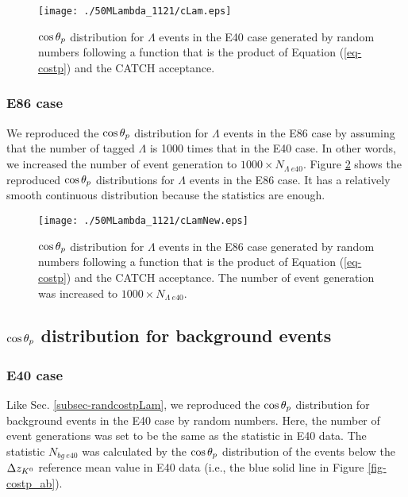 \begin{figure}[h]
  \centering
  \texttt{[image: ./50MLambda\_1121/cLam.eps]}
  \caption{$\cos{\theta_p}$ distribution for $\Lambda$ events in the E40 case generated by random numbers following a function that is the product of Equation (\ref{eq-costp}) and the CATCH acceptance. %
  }
  \label{fig-cLam}
\end{figure}

\subsubsection{E86 case}
We reproduced the $\cos{\theta_p}$ distribution for $\Lambda$ events in the E86 case by assuming that the number of tagged $\Lambda$ is 1000 times that in the E40 case. In other words, we increased the number of event generation to $1000\times N_{\Lambda\ e40}$. Figure \ref{fig-cLamNew} shows the reproduced $\cos{\theta_p}$ distributions for $\Lambda$ events in the E86 case. It has a relatively smooth continuous distribution because the statistics are enough.

\begin{figure}[h]
  \centering
  \texttt{[image: ./50MLambda\_1121/cLamNew.eps]}
  \caption{$\cos{\theta_p}$ distribution for $\Lambda$ events in the E86 case generated by random numbers following a function that is the product of Equation (\ref{eq-costp}) and the CATCH acceptance. The number of event generation was increased to $1000\times N_{\Lambda\ e40}$.}
  \label{fig-cLamNew}
\end{figure}


\subsection{$\cos{\theta_p}$ distribution for background events}
\label{subsec-randcostpBG}
\subsubsection{E40 case}
Like Sec. \ref{subsec-randcostpLam}, we reproduced the $\cos{\theta_p}$ distribution for background events in the E40 case by random numbers. Here, the number of event generations was set to be the same as the statistic in E40 data. The statistic $N_{bg\ e40}$ was calculated by the $\cos{\theta_p}$ distribution of the events below the $\Delta z_{K^{0}}$ reference mean value in E40 data (i.e., the blue solid line in Figure \ref{fig-costp_ab}). 


